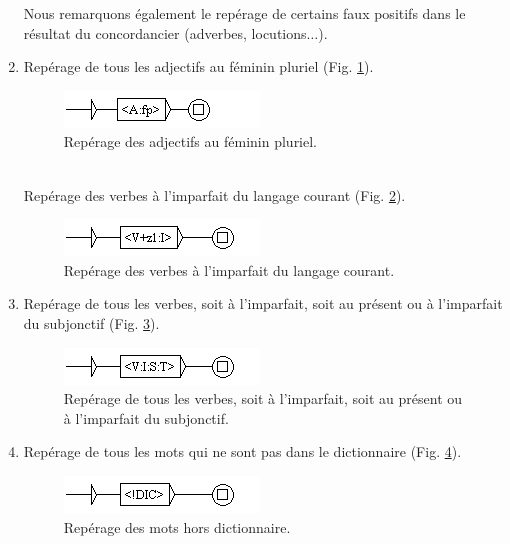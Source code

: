 \documentclass[xcolor={table,usenames,dvipsnames}]{article}
\begin{document}
\begin{enumerate}
	Nous remarquons également le repérage de certains faux positifs dans le résultat du concordancier (adverbes, locutions$\dots$).
	
	\bigskip
	\item Repérage de tous les adjectifs au féminin pluriel (Fig. \ref{fig:adjectif_fp}).
		\begin{figure}[H] %
		\centering
		\includegraphics[width=.7\linewidth]{img/adjectif_fp.png}
		\caption{Repérage des adjectifs au féminin pluriel.}
		\label{fig:adjectif_fp}
	\end{figure}
	
	\\
	\bigskip
	Repérage des verbes à l'imparfait du langage courant (Fig. \ref{fig:verbe_impf}).
			\begin{figure}[H] %
		\centering
		\includegraphics[width=.7\linewidth]{img/verbe_impf_courant.png}
		\caption{Repérage des verbes à l'imparfait du langage courant.}
		\label{fig:verbe_impf}
	\end{figure}
	
	\item Repérage de tous les verbes, soit à l'imparfait, soit au présent ou à l'imparfait du subjonctif (Fig. \ref{fig:verbe_impf_pres_impfsubj}).
				\begin{figure}[H] %
		\centering
		\includegraphics[width=.7\linewidth]{img/verbe_impf_pres_impfsubj.png}
		\caption{Repérage de tous les verbes, soit à l'imparfait, soit au présent ou à l'imparfait du subjonctif.}
		\label{fig:verbe_impf_pres_impfsubj}
	\end{figure}
	
	\item Repérage de tous les mots qui ne sont pas dans le dictionnaire (Fig. \ref{fig:dic}).
					\begin{figure}[H] %
		\centering
		\includegraphics[width=.7\linewidth]{img/dic.png}
		\caption{Repérage des mots hors dictionnaire.}
		\label{fig:dic}
	\end{figure}
	

\end{enumerate}
\end{document}
